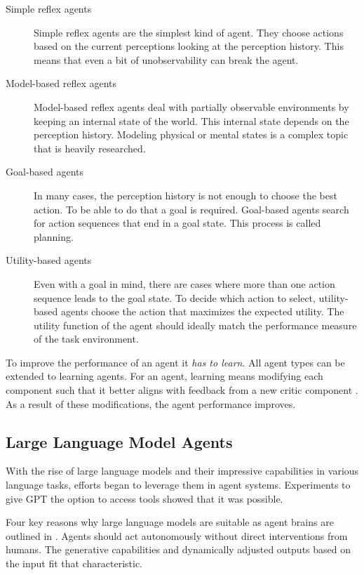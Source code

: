 \documentclass[../main.tex]{subfiles}
\begin{document}
\begin{description}
    \item[Simple reflex agents]
        Simple reflex agents are the simplest kind of agent.
        They choose actions based on the current perceptions looking at the perception history.
        This means that even a bit of unobservability can break the agent.
    \item[Model-based reflex agents]
        Model-based reflex agents deal with partially observable environments
        by keeping an internal state of the world.
        This internal state depends on the perception history.
        Modeling physical or mental states is a complex topic that is heavily researched.
    \item[Goal-based agents]
        In many cases, the perception history is not enough to choose the best action.
        To be able to do that a goal is required.
        Goal-based agents search for action sequences that end in a goal state.
        This process is called planning.
    \item[Utility-based agents]
        Even with a goal in mind, there are cases where more than one action sequence leads to the goal state.
        To decide which action to select, utility-based agents choose the action that maximizes the expected utility.
        The utility function of the agent should ideally match the performance measure of the task environment.
\end{description}

To improve the performance of an agent it \emph{has to learn}.
All agent types can be extended to learning agents.
For an agent, learning means modifying each component
such that it better aligns with feedback from a new critic component \autocite{Russel2022}.
As a result of these modifications, the agent performance improves.

\subsection{Large Language Model Agents}

With the rise of large language models and their impressive capabilities in various language tasks,
efforts began to leverage them in agent systems.
Experiments to give GPT the option to access tools \autocite{Shen2023, Schick2023} showed that it was possible.

Four key reasons why large language models are suitable as agent brains are outlined in \cite{Xi2023}.
Agents should act autonomously without direct interventions from humans.
The generative capabilities and dynamically adjusted outputs based on the input fit that characteristic.
\end{document}
